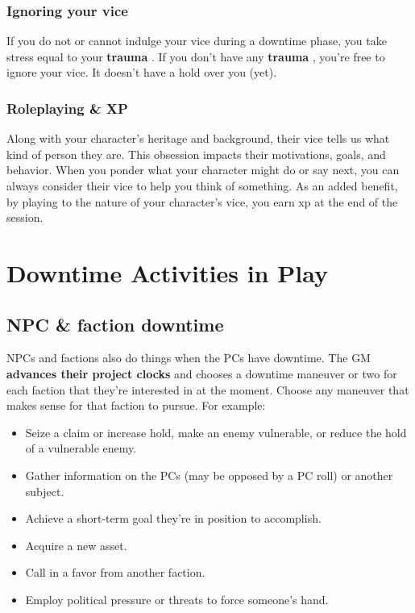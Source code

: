 \documentclass[11pt,fleqn,a5paper]{book}
\newcommand{\gameterm}[1]{\textbf{#1}}
\begin{document}
\subsection{Ignoring your vice}

If you do not or cannot indulge your vice during a downtime phase, you take stress equal to your \gameterm{trauma} . If you don’t have any \gameterm{trauma} , you’re free to ignore your vice. It doesn’t have a hold over you (yet).

\subsection{Roleplaying \& XP}

Along with your character’s heritage and background, their vice tells us what kind of person they are. This obsession impacts their motivations, goals, and behavior. When you ponder what your character might do or say next, you can always consider their vice to help you think of something. As an added benefit, by playing to the nature of your character’s vice, you earn xp at the end of the session.

\chapter{Downtime Activities in Play}

\section{NPC \& faction downtime}

NPCs and factions also do things when the PCs have downtime. The GM \textbf{advances their project clocks} and chooses a downtime maneuver or two for each faction that they’re interested in at the moment. Choose any maneuver that makes sense for that faction to pursue. For example:

\begin{itemize}
	\item Seize a claim or increase hold, make an enemy vulnerable, or reduce the hold of a vulnerable enemy.
	\item Gather information on the PCs (may be opposed by a PC roll) or another subject.
	\item Achieve a short-term goal they’re in position to accomplish.
	\item Acquire a new asset.
	\item Call in a favor from another faction.
	\item Employ political pressure or threats to force someone’s hand.
\end{itemize}
\end{document}
